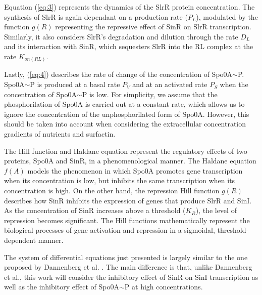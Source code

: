 Equation (\ref{eq:3}) represents the dynamics of the SlrR protein concentration. 
The synthesis of SlrR is again dependant on a production rate ($P_L$), modulated by the function $g(R)$ representing the repressive effect of SinR on SlrR transcription. Similarly, it also considers SlrR's degradation and dilution through the rate $D_L$ and its interaction with SinR, which sequesters SlrR into the RL complex at the rate $K_{on(RL)}$.

Lastly, (\ref{eq:4}) describes the rate of change of the concentration of Spo0A$\sim$P. Spo0A$\sim$P
is produced at a basal rate $P_V$ and at an activated rate $P_S$ when the concentration of Spo0A$\sim$P is low. For
simplicity, we assume that the phosphorilation of Spo0A is carried out at a constant rate, which allows us
to ignore the concentration of the unphosphorilated form of Spo0A. However, this should be taken into account
when considering the extracellular concentration gradients of nutrients and surfactin.

The Hill function and Haldane equation represent the regulatory effects of two proteins, Spo0A and SinR, 
in a phenomenological manner.
 The Haldane equation \( f(A) \) models the phenomenon in which Spo0A promotes gene transcription
 when its concentration is low, but inhibits the same transcription when its concentration is high.
  On the other hand, the repression Hill function \( g(R) \) describes how SinR 
  inhibits the expression of genes that produce SlrR and SinI.
   As the concentration of SinR increases above a threshold ($K_R$), the level 
   of repression becomes significant. The Hill functions mathematically represent the biological
    processes of gene activation and repression in a sigmoidal, threshold-dependent manner.

The system of differential equations just presented is largely similar to the one proposed by Dannenberg et al. {\footnotesize\cite{simon}}. 
The main difference is that, unlike Dannenberg et al., 
this work will consider the inhibitory effect of SinR on SinI transcription as well as the inhibitory effect of
Spo0A$\sim$P at high concentrations.

